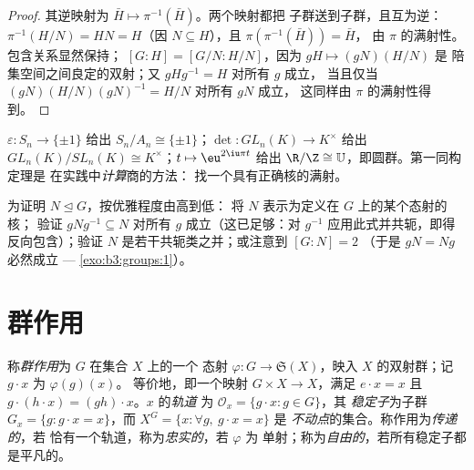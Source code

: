 \begin{proof}
其逆映射为 $\bar H \mapsto \pi^{-1}(\bar H)$。两个映射都把
子群送到子群，且互为逆：$\pi^{-1}(H/N) =
HN = H$（因 $N \subseteq H$），且 $\pi(\pi^{-1}(\bar H)) = \bar H$，
由 $\pi$ 的满射性。包含关系显然保持；
$[G:H] = [G/N : H/N]$，因为 $gH \mapsto (gN)(H/N)$ 是
陪集空间之间良定的双射；又 $gHg^{-1} = H$ 对所有 $g$ 成立，
当且仅当 $(gN)(H/N)(gN)^{-1} = H/N$ 对所有 $gN$ 成立，
这同样由 $\pi$ 的满射性得到。
\end{proof}

\begin{example}\label{ex:b3:groups:firstiso}
$\varepsilon \colon S_n \to \{\pm 1\}$ 给出 $S_n/A_n \cong
\{\pm1\}$；$\det \colon GL_n(K) \to K^\times$ 给出
$GL_n(K)/SL_n(K) \cong K^\times$；$t \mapsto \eu^{2\iu\pi t}$ 给出
$\R/\Z \cong \mathbb U$，即圆群。第一同构定理是
在实践中\emph{计算}商的方法：
找一个具有正确核的满射。
\end{example}

\begin{method}\label{met:b3:groups:normal}
为证明 $N \trianglelefteq G$，按优雅程度由高到低：
将 $N$ 表示为定义在 $G$ 上的某个态射的核；
验证 $gNg^{-1} \subseteq N$ 对所有 $g$ 成立（这已足够：对
$g^{-1}$ 应用此式并共轭，即得反向包含）；验证
$N$ 是若干共轭类之并；或注意到 $[G:N] = 2$
（于是 $gN = Ng$ 必然成立 --- \cref{exo:b3:groups:1}）。
\end{method}

\section{群作用}

\begin{definition}\label{def:b3:groups:action}
称\emph{群作用}为 $G$ 在集合 $X$ 上的一个
态射 $\varphi \colon G \to \mathfrak{S}(X)$，映入
$X$ 的双射群；记 $g \cdot x$ 为 $\varphi(g)(x)$。
等价地，即一个映射 $G \times X \to X$，满足 $e \cdot x = x$ 且 $g
\cdot (h \cdot x) = (gh) \cdot x$。$x$ 的\emph{轨道}
为 $\mathcal O_x = \{g \cdot x : g \in G\}$，其
\emph{稳定子}为子群 $G_x = \{g :
g\cdot x = x\}$，而 $X^G = \{x : \forall g,\ g \cdot x = x\}$ 是
\emph{不动点}的集合。称作用为\emph{传递的}，若
恰有一个轨道，称为\emph{忠实的}，若 $\varphi$ 为
单射；称为\emph{自由的}，若所有稳定子都是平凡的。
\end{definition}


